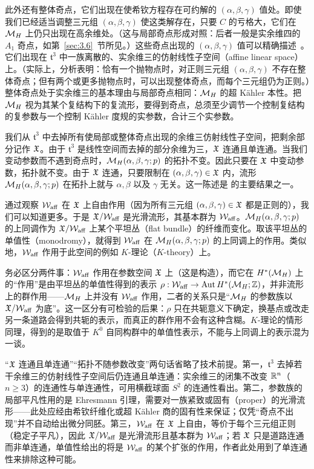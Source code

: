 此外还有整体奇点，它们出现在使希钦方程存在可约解的 $(\alpha,\beta,\gamma)$ 值处。即使我们已经适当调整三元组 $(\alpha,\beta,\gamma)$ 使这类解存在，只要 $C$ 的亏格大，它们在 ${{\mathcal{M}}_H}$ 上仍只出现在高余维处。（这与局部奇点形成对照：后者一般是实余维四的 $A_1$ 奇点，如第~\ref{sec:3.6}~节所见。）这些奇点出现的 $(\alpha,\beta,\gamma)$ 值可以精确描述~\cite{ref24}。它们出现在 $\mathfrak t^3$ 中一族离散的、实余维三的仿射线性子空间（affine linear space）上。（实际上，分析表明：恰有一个抛物点时，对正则三元组 $(\alpha,\beta,\gamma)$ 不存在整体奇点；但有两个或更多抛物点时，可以出现整体奇点，而每个三元组仍为正则。）整体奇点处于实余维三的基本理由与局部奇点相同：${\mathcal{M}}_H$ 的超 Kähler 本性。把 ${{\mathcal{M}}_H}$ 视为其某个复结构下的复流形，要得到奇点，总须至少调节一个控制复结构的复参数与一个控制 Kähler 度规的实参数，合计三个实参数。

我们从 $\mathfrak t^3$ 中去掉所有使局部或整体奇点出现的余维三仿射线性子空间，把剩余部分记作 $\mathfrak{X}$。由于 $\mathfrak t^3$ 是线性空间而去掉的部分余维为三，$\mathfrak{X}$ 连通且单连通。当我们变动参数而不遇到奇点时，${{\mathcal{M}}_H}(\alpha,\beta,\gamma;p)$ 的拓扑不变。因此只要在 $\mathfrak{X}$ 中变动参数，拓扑就不变。由于 $\mathfrak{X}$ 连通，只要限制在 $(\alpha,\beta,\gamma)\in \mathfrak{X}$ 内，流形 ${{\mathcal{M}}_H}(\alpha,\beta,\gamma;p)$ 在拓扑上就与 $\alpha,\beta$ 以及 $\gamma$ 无关。这一陈述是 \cite{ref24} 的主要结果之一。

通过观察 ${\mathcal W}_{\rm aff}$ 在 $\mathfrak{X}$ 上自由作用（因为所有三元组 $(\alpha,\beta,\gamma)\in \mathfrak{X}$ 都是正则的），我们可以知道更多。于是 $\mathfrak{X}/{\mathcal W}_{\rm aff}$ 是光滑流形，其基本群为 ${\mathcal W}_{\rm aff}$。${{\mathcal{M}}_H}(\alpha,\beta, \gamma;p)$ 的上同调作为 $\mathfrak{X}/{\mathcal W}_{\rm aff}$ 上某个平坦丛（flat bundle）的纤维而变化。取该平坦丛的单值性（monodromy），就得到 ${\mathcal W}_{\rm aff}$ 在 ${{\mathcal{M}}_H}(\alpha,\beta,\gamma;p)$ 的上同调上的作用。类似地，${\mathcal W}_{\rm aff}$ 作用于此空间的例如 $K$-理论（$K$-theory）上。

\begin{yizhu}[易错点]
务必区分两件事：${\mathcal W}_{\rm aff}$ 作用在参数空间 $\mathfrak{X}$ 上（这是构造），而它在 $H^*({{\mathcal{M}}_H})$ 上的“作用”是由平坦丛的单值性得到的表示 $\rho:{\mathcal W}_{\rm aff}\to{\rm Aut}\,H^*({{\mathcal{M}}_H};{\mathbb{Z}})$，并非流形上的群作用——${{\mathcal{M}}_H}$ 上并没有 ${\mathcal W}_{\rm aff}$ 作用，二者的关系只是“${{\mathcal{M}}_H}$ 的参数族以 $\mathfrak{X}/{\mathcal W}_{\rm aff}$ 为底”。这一区分有可检验的后果：$\rho$ 只在共轭意义下确定，换基点或改走另一条道路会得到共轭的表示，而真正的群作用不会有这种含糊。$K$-理论的情形同理，得到的是取值于 $K^0$ 自同构群中的单值性表示，不能与上同调上的表示混为一谈。
\end{yizhu}

\begin{yizhu}[含糊点拨]
“$\mathfrak{X}$ 连通且单连通”“拓扑不随参数改变”两句话省略了技术前提。第一，$\mathfrak t^3$ 去掉若干余维三的仿射线性子空间后仍连通且单连通：实余维三的闭集不改变 ${\mathbb{R}}^n$（$n\geq 3$）的连通性与单连通性，可用横截球面 $S^2$ 的连通性看出。第二，参数族的局部平凡性用的是 Ehresmann 引理，需要对一族紧致或固有（proper）的光滑流形——此处应经由希钦纤维化或超 Kähler 商的固有性来保证；仅凭“奇点不出现”并不自动给出微分同胚。第三，${\mathcal W}_{\rm aff}$ 在 $\mathfrak{X}$ 上自由，等价于每个三元组正则（稳定子平凡），因此 $\mathfrak{X}/{\mathcal W}_{\rm aff}$ 是光滑流形且基本群为 ${\mathcal W}_{\rm aff}$；若 $\mathfrak{X}$ 只是道路连通而非单连通，单值性给出的将是 ${\mathcal W}_{\rm aff}$ 的某个扩张的作用，作者此处用到了单连通性来排除这种可能。
\end{yizhu}

